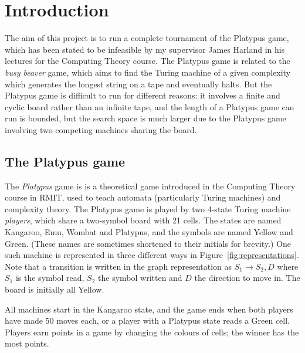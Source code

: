 \chapter{Introduction}

The aim of this project is to run a complete tournament
of the Platypus game, which has been stated to be infeasible
by my supervisor James Harland in his lectures for the
Computing Theory course.
The Platypus game is related to the \emph{busy beaver} game,
which aims to find the Turing machine of a given complexity
which generates the longest string on a tape and eventually halts.
But the Platypus game is difficult to run for different reasons: it
involves a finite and cyclic board rather than an infinite tape, and
the length of a Platypus game can run is bounded, but the search space
is much larger due to the Platypus game involving two competing
machines sharing the board.

\section{The Platypus game}

The \emph{Platypus} game is is a theoretical game introduced in the
Computing Theory course in RMIT, used to teach automata
(particularly Turing machines) and complexity theory.
The Platypus game is played by two 4-state Turing machine
\emph{players}, which share a two-symbol board with 21 cells. The states
are named Kangaroo, Emu, Wombat and Platypus, and the symbols
are named Yellow and Green. (These names are sometimes shortened
to their initials for brevity.) One such machine is represented in three
different ways in Figure~\ref{fig:representations}. Note that a transition
is written in the graph representation as $S_1 \rightarrow S_2, D$ where
$S_1$ is the symbol read, $S_2$ the symbol written and $D$ the direction
to move in. The board is initially all Yellow.

All machines start in the Kangaroo state, and the game ends when
both players have made 50 moves each, or a player with a Platypus
state reads a Green cell.
Players earn points in a game by changing the colours of cells; the
winner has the most points.

